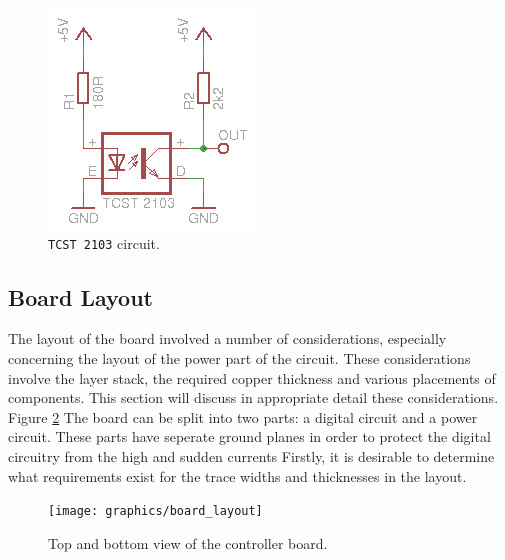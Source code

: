 \begin{figure}
	\centering
	\includegraphics[width=0.4\linewidth]{graphics/tcst_circuit_temp.jpg}
	\caption{\texttt{TCST 2103} circuit.}
	\label{fig:tcst_circuit}
\end{figure}

\subsection{Board Layout} %
\label{sub:board_layout}
The layout of the board involved a number of considerations, especially concerning the layout of the power part of the circuit.
These considerations involve the layer stack, the required copper thickness and various placements of components.
This section will discuss in appropriate detail these considerations.
Figure \ref{fig:board_layout} 
The board can be split into two parts: a digital circuit and a power circuit.
These parts have seperate ground planes in order to protect the digital circuitry from the high and sudden currents
Firstly, it is desirable to determine what requirements exist for the trace widths and thicknesses in the layout.

\begin{figure}
	\centering
	\texttt{[image: graphics/board\_layout]}
	\caption{Top and bottom view of the controller board.}
	\label{fig:board_layout}
\end{figure}

